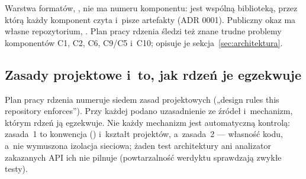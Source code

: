Warstwa formatów, , nie ma numeru komponentu: jest wspólną
biblioteką, przez którą każdy komponent czyta i~pisze artefakty (ADR 0001). Publiczny okaz
ma własne repozytorium, . Plan pracy rdzenia
śledzi też znane trudne problemy komponentów C1, C2, C6, C9/C5 i~C10; opisuje je
sekcja~\ref{sec:architektura}.


\subsection{Zasady projektowe i~to, jak rdzeń je egzekwuje}\label{sec:rdzen-zasady}

Plan pracy rdzenia numeruje siedem zasad projektowych („design rules this repository
enforces”). Przy każdej podano uzasadnienie ze źródeł i~mechanizm, którym rdzeń ją
egzekwuje. Nie każdy mechanizm jest automatyczną kontrolą: zasada~1 to konwencja
() i~kształt projektów, a~zasada~2 --- własność kodu, a~nie wymuszona
izolacja sieciowa; żaden test architektury ani analizator zakazanych API ich nie pilnuje
(powtarzalność werdyktu sprawdzają zwykłe testy).

